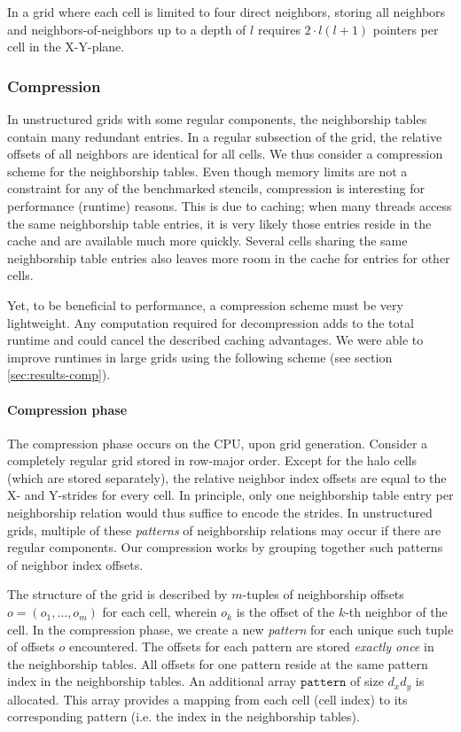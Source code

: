 In a grid where each cell is limited to four direct neighbors, storing all neighbors and neighbors-of-neighbors up to a depth of $l$ requires $2\cdot l(l+1)$ pointers per cell in the X-Y-plane.

\subsubsection{Compression} \label{sec:compression}

In unstructured grids with some regular components, the neighborship tables contain many redundant entries. In a regular subsection of the grid, the relative offsets of all neighbors are identical for all cells. We thus consider a  compression scheme for the neighborship tables. Even though memory limits are not a constraint for any of the benchmarked stencils, compression is interesting for performance (runtime) reasons. This is due to caching; when many threads access the same neighborship table entries, it is very likely those entries reside in the cache and are available much more quickly. Several cells sharing the same neighborship table entries also leaves more room in the cache for entries for other cells.

Yet, to be beneficial to performance, a compression scheme must be very lightweight. Any computation required for decompression adds to the total runtime and could cancel the described caching advantages. We were able to improve runtimes in large grids using the following scheme (see section \ref{sec:results-comp}).

\paragraph{Compression phase}

The compression phase occurs on the CPU, upon grid generation. Consider a completely regular grid stored in row-major order. Except for the halo cells (which are stored separately), the relative neighbor index offsets are equal to the X- and Y-strides for every cell. In principle, only one neighborship table entry per neighborship relation would thus suffice to encode the strides. In unstructured grids, multiple of these \emph{patterns} of neighborship relations may occur if there are regular components. Our compression works by grouping together such patterns of neighbor index offsets. 

The structure of the grid is described by $m$-tuples of neighborship offsets $o = (o_1, \dots, o_m)$ for each cell, wherein $o_k$ is the offset of the $k$-th neighbor of the cell. In the compression phase, we create a new \emph{pattern} for each unique such tuple of offsets $o$ encountered. The offsets for each pattern are stored \emph{exactly once} in the neighborship tables. All offsets for one pattern reside at the same pattern index in the neighborship tables. An additional array $\mathtt{pattern}$ of size $d_xd_y$ is allocated. This array provides a mapping from each cell (cell index) to its corresponding pattern (i.e. the index in the neighborship tables).

